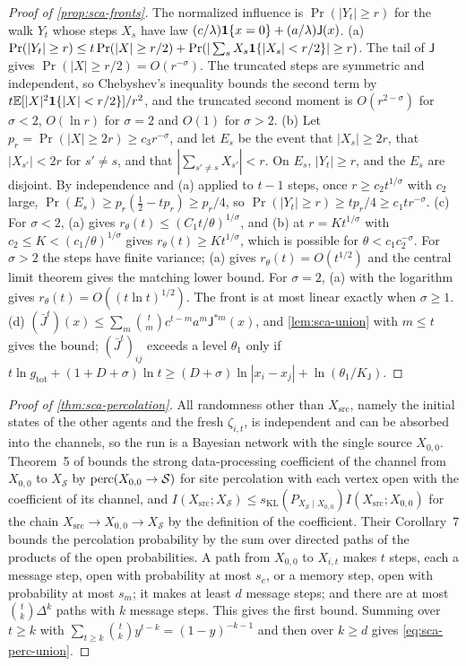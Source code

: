 \begin{proof}[Proof of \cref{prop:sca-fronts}]
The normalized influence is $\Pr(|Y_t|\ge r)$ for the walk $Y_t$ whose steps $X_s$ have law $(c/\lambda)\mathbf{1}\{x=0\}+(a/\lambda)\mathsf J(x)$. (a) $\Pr(|Y_t|\ge r)\le t\Pr(|X|\ge r/2)+\Pr(|\sum_sX_s\mathbf{1}\{|X_s|<r/2\}|\ge r)$. The tail of $\mathsf J$ gives $\Pr(|X|\ge r/2)=O(r^{-\sigma})$. The truncated steps are symmetric and independent, so Chebyshev's inequality bounds the second term by $t\mathbb{E}[|X|^2\mathbf{1}\{|X|<r/2\}]/r^2$, and the truncated second moment is $O(r^{2-\sigma})$ for $\sigma<2$, $O(\ln r)$ for $\sigma=2$ and $O(1)$ for $\sigma>2$. (b) Let $p_r=\Pr(|X|\ge2r)\ge c_3r^{-\sigma}$, and let $E_s$ be the event that $|X_s|\ge2r$, that $|X_{s'}|<2r$ for $s'\neq s$, and that $|\sum_{s'\neq s}X_{s'}|<r$. On $E_s$, $|Y_t|\ge r$, and the $E_s$ are disjoint. By independence and (a) applied to $t-1$ steps, once $r\ge c_2t^{1/\sigma}$ with $c_2$ large, $\Pr(E_s)\ge p_r(\tfrac12-tp_r)\ge p_r/4$, so $\Pr(|Y_t|\ge r)\ge tp_r/4\ge c_1tr^{-\sigma}$. (c) For $\sigma<2$, (a) gives $r_\theta(t)\le(C_1t/\theta)^{1/\sigma}$, and (b) at $r=Kt^{1/\sigma}$ with $c_2\le K<(c_1/\theta)^{1/\sigma}$ gives $r_\theta(t)\ge Kt^{1/\sigma}$, which is possible for $\theta<c_1c_2^{-\sigma}$. For $\sigma>2$ the steps have finite variance; (a) gives $r_\theta(t)=O(t^{1/2})$ and the central limit theorem gives the matching lower bound. For $\sigma=2$, (a) with the logarithm gives $r_\theta(t)=O((t\ln t)^{1/2})$. The front is at most linear exactly when $\sigma\ge1$. (d) $(\bar J^t)(x)\le\sum_m\binom tmc^{t-m}a^m\mathsf J^{\ast m}(x)$, and \cref{lem:sca-union} with $m\le t$ gives the bound; $(\bar J^t)_{ij}$ exceeds a level $\theta_1$ only if $t\ln g_{\mathrm{tot}}+(1+D+\sigma)\ln t\ge(D+\sigma)\ln|x_i-x_j|+\ln(\theta_1/K_{\mathsf J})$.
\end{proof}

\begin{proof}[Proof of \cref{thm:sca-percolation}]
All randomness other than $X_{\mathrm{src}}$, namely the initial states of the other agents and the fresh $\zeta_{i,t}$, is independent and can be absorbed into the channels, so the run is a Bayesian network with the single source $X_{0,0}$. Theorem~5 of \citet{polyanskiy2017strong} bounds the strong data-processing coefficient of the channel from $X_{0,0}$ to $X_{\mathcal S}$ by $\operatorname{perc}(X_{0,0}\to\mathcal S)$ for site percolation with each vertex open with the coefficient of its channel, and $I(X_{\mathrm{src}};X_{\mathcal S})\le s_{\mathrm{KL}}(P_{X_{\mathcal S}\mid X_{0,0}})I(X_{\mathrm{src}};X_{0,0})$ for the chain $X_{\mathrm{src}}\to X_{0,0}\to X_{\mathcal S}$ by the definition of the coefficient. Their Corollary~7 bounds the percolation probability by the sum over directed paths of the products of the open probabilities. A path from $X_{0,0}$ to $X_{i,t}$ makes $t$ steps, each a message step, open with probability at most $s_e$, or a memory step, open with probability at most $s_m$; it makes at least $d$ message steps; and there are at most $\binom tk\Delta^k$ paths with $k$ message steps. This gives the first bound. Summing over $t\ge k$ with $\sum_{t\ge k}\binom tky^{t-k}=(1-y)^{-k-1}$ and then over $k\ge d$ gives \eqref{eq:sca-perc-union}.
\end{proof}

